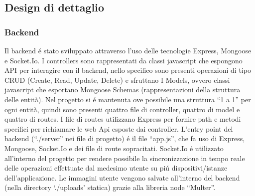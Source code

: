 \documentclass{report}
\begin{document}
\subsection{Design di dettaglio}
\subsubsection{Backend}
Il backend é stato sviluppato attraverso l’uso delle tecnologie Express, Mongoose e Socket.Io.
\newline
I controllers sono rappresentati da classi javascript che espongono API per interagire con il backend, nello specifico sono presenti operazioni di tipo CRUD (Create, Read, Update, Delete) e sfruttano I Models, ovvero classi javascript che esportano Mongoose Schemas (rappresentazioni della struttura delle entità). Nel progetto si é mantenuta ove possibile una struttura “1 a 1” per ogni entità, quindi sono presenti quattro file di controller,  quattro di model e quattro di routes.
\newline
I file di routes utilizzano Express per fornire path e metodi specifici per richiamare le web Api esposte dai controller.
\newline
L’entry point del backend (“./server” nei file di progetto) é il file “app.js”, che fa uso di Express, Mongoose, Socket.Io e dei file di route sopracitati. Socket.Io é utilizzato all’interno del progetto per rendere possibile la sincronizzazione in tempo reale delle operazioni effettuate dal medesimo utente su piú dispositivi/istanze dell’applicazione.
\newline
Le immagini utente vengono salvate all’interno del backend (nella directory ‘./uploads’ statica) grazie alla libreria node “Multer”.
\end{document}
